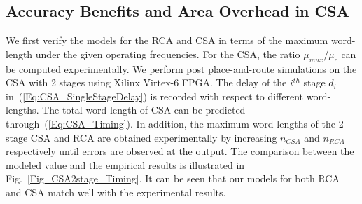 \documentclass[prodmode,acmtrets]{acmsmall} %
\begin{document}
\subsection{Accuracy Benefits and Area Overhead in CSA}
We first verify the models for the RCA and CSA in terms of the maximum word-length under the given operating frequencies. For the CSA, the ratio $\mu_{mux}/\mu_c$ can be computed experimentally. We perform post place-and-route simulations on the CSA with 2 stages using Xilinx Virtex-6 FPGA. The delay of the $i^{th}$ stage $d_i$ in~(\ref{Eq:CSA_SingleStageDelay}) is recorded with respect to different word-lengths. The total word-length of CSA can be predicted through~(\ref{Eq:CSA_Timing}). In addition, the maximum word-lengths of the 2-stage CSA and RCA are obtained experimentally by increasing $n_{CSA}$ and $n_{RCA}$ respectively until errors are observed at the output. The comparison between the modeled value and the empirical results is illustrated in Fig.~\ref{Fig_CSA2stage_Timing}. It can be seen that our models for both RCA and CSA match well with the experimental results.
%
%
\end{document}
